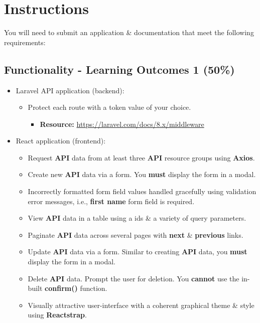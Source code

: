 \documentclass{article}
\begin{document}
\newpage

\section*{Instructions}
You will need to submit an application \& documentation that meet the following requirements:

\subsection*{Functionality - Learning Outcomes 1 (50\%)}

\begin{itemize}
	\item Laravel API application (backend):
	\begin{itemize}
		\item Protect each route with a token value of your choice.
		\begin{itemize}
			\item \textbf{Resource:} \footnotesize\href{https://laravel.com/docs/8.x/middleware}{https://laravel.com/docs/8.x/middleware}
		\end{itemize}
	\end{itemize}
	\item React application (frontend):
	\begin{itemize}
		\item Request \textbf{API} data from at least three \textbf{API} resource groups using \textbf{Axios}.
		\item Create new \textbf{API} data via a form. You \textbf{must} display the form in a modal.
		\item Incorrectly formatted form field values handled gracefully using validation error messages, i.e., \textbf{first name} form field is required.
		\item View \textbf{API} data in a table using a ids \& a variety of query parameters. 
		\item Paginate \textbf{API} data across several pages with \textbf{next} \& \textbf{previous} links.
		\item Update \textbf{API} data via a form. Similar to creating \textbf{API} data, you \textbf{must} display the form in a modal. 
		\item Delete \textbf{API} data. Prompt the user for deletion. You \textbf{cannot} use the in-built \textbf{confirm()} function.
		\item Visually attractive user-interface with a coherent graphical theme \& style using \textbf{Reactstrap}.

\end{itemize}
\end{itemize}
\end{document}
